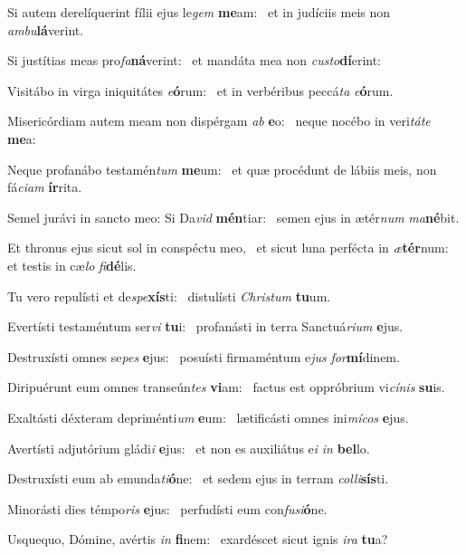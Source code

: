 \item Si autem derelíquerint fílii ejus le\textit{gem} \textbf{me}am:~\psstar{} et in judíciis meis non \textit{ambu}\textbf{lá}verint.
\item Si justítias meas pro\textit{fa}\textbf{ná}ve\-rint:~\psstar{} et mandáta mea non \textit{custo}\textbf{dí}erint:
\item Visitábo in virga iniquitátes \textit{e}\textbf{ó}rum:~\psstar{} et in verbéribus peccá\textit{ta} \textit{e}\textbf{ó}rum.
\item Misericórdiam autem meam non dispérgam \textit{ab} \textbf{e}o:~\psstar{} neque nocébo in veri\textit{táte} \textbf{me}a:
\item Neque profanábo testamén\textit{tum} \textbf{me}um:~\psstar{} et quæ procédunt de lábiis meis, non fá\textit{ciam} \textbf{ír}rita.
\item Semel jurávi in sancto meo: Si Da\textit{vid} \textbf{mén}tiar:~\psstar{} semen ejus in ætér\textit{num} \textit{ma}\textbf{né}bit.
\item Et thronus ejus sicut sol in conspéctu meo,~\pscross{} et sicut luna perfécta in \textit{æ}\textbf{tér}num:~\psstar{} et testis in cæ\textit{lo} \textit{fi}\textbf{dé}lis.
\item Tu vero repulísti et de\textit{spe}\textbf{xís}ti:~\psstar{} distulísti \textit{Christum} \textbf{tu}um.
\item Evertísti testaméntum ser\textit{vi} \textbf{tu}i:~\psstar{} profanásti in terra Sanctuá\textit{rium} \textbf{e}jus.
\item Destruxísti omnes se\textit{pes} \textbf{e}jus:~\psstar{} posuísti firmaméntum e\textit{jus} \textit{for}\textbf{mí}dinem.
\item Diripuérunt eum omnes transeún\textit{tes} \textbf{vi}am:~\psstar{} factus est oppróbrium vi\textit{cínis} \textbf{su}is.
\item Exaltásti déxteram depriménti\textit{um} \textbf{e}um:~\psstar{} lætificásti omnes ini\textit{mícos} \textbf{e}jus.
\item Avertísti adjutórium gládi\textit{i} \textbf{e}jus:~\psstar{} et non es auxiliátus e\textit{i} \textit{in} \textbf{bel}lo.
\item Destruxísti eum ab emunda\textit{ti}\-\textbf{ó}ne:~\psstar{} et sedem ejus in terram \textit{colli}\textbf{sís}ti.
\item Minorásti dies témpo\textit{ris} \textbf{e}jus:~\psstar{} perfudísti eum con\textit{fusi}\textbf{ó}ne.
\item Usquequo, Dómine, avértis \textit{in} \textbf{fi}nem:~\psstar{} exardéscet sicut ignis \textit{ira} \textbf{tu}a?
